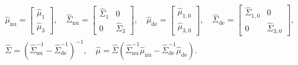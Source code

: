 \begin{equation}
  \begin{gathered}
    \widehat{\mu}_{\text{nu}} = \begin{bmatrix}
      \widehat{\mu}_{1} \\
      \widehat{\mu}_{3}
    \end{bmatrix}\!\!, \quad
    \widehat{\Sigma}_{\text{nu}} = \begin{bmatrix}
      \widehat{\Sigma}_{1} & 0 \\
      0 & \widehat{\Sigma}_{3}
    \end{bmatrix}\!\!, \quad
    \widehat{\mu}_{\text{de}} = \begin{bmatrix}
      \widehat{\mu}_{1, 0} \\
      \widehat{\mu}_{3, 0}
    \end{bmatrix}\!\!, \quad
    \widehat{\Sigma}_{\text{de}} = \begin{bmatrix}
      \widehat{\Sigma}_{1, 0} & 0 \\
      0 & \widehat{\Sigma}_{3, 0}
    \end{bmatrix}\!\!, \\[1.5ex]
    \widehat{\Sigma} = \left(
      \widehat{\Sigma}_{\text{nu}}^{-1} - \widehat{\Sigma}_{\text{de}}^{-1}
    \right)^{-1}, \quad
    \widehat{\mu} = \widehat{\Sigma} \left(
      \widehat{\Sigma}_{\text{nu}}^{-1}\widehat{\mu}_{\text{nu}} - \widehat{\Sigma}_{\text{de}}^{-1}\widehat{\mu}_{\text{de}}
    \right).
  \end{gathered}
  \label{eqn:in-text-normal-approx}
\end{equation}